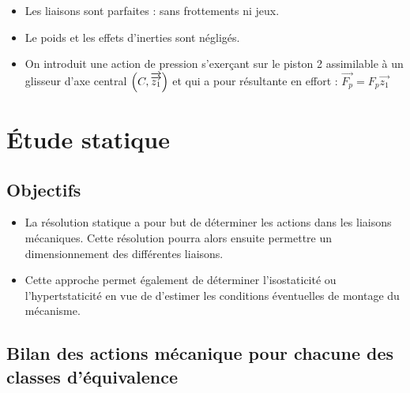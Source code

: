 \documentclass[10pt,fleqn]{article} %
\begin{document}
\begin{multicols}{2}
\begin{multicols}{2}
\begin{itemize}
\item Les liaisons sont parfaites : sans frottements ni jeux.
\item Le poids et les effets d'inerties sont négligés.
\item On introduit une action de pression s'exerçant sur le piston 2 assimilable à un glisseur d'axe central $\left(C,\overrightarrow{\overrightarrow{z_1}}\right)$ et qui a pour résultante en effort : $\overrightarrow{F_p}=F_p\overrightarrow{z_1}$
\end{itemize}


\section{Étude statique}
\subsection{Objectifs}
\begin{itemize}
\item La résolution statique a pour but de déterminer les actions dans les liaisons mécaniques. Cette résolution pourra alors ensuite permettre un dimensionnement des différentes liaisons.
\item Cette approche permet également de déterminer l'isostaticité ou l'hypertstaticité en vue de d'estimer les conditions éventuelles de montage du mécanisme.
\end{itemize}

\subsection{Bilan des actions mécanique pour chacune des classes d'équivalence}

\end{multicols}
\end{multicols}
\end{document}
